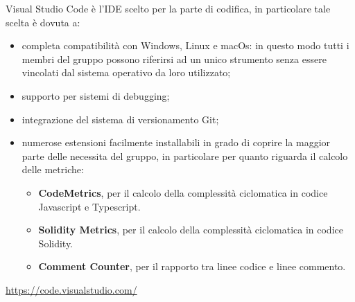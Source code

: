 	Visual Studio Code è l'IDE scelto per la parte di codifica, in particolare tale scelta è dovuta a:
	\begin{itemize}
		\item completa compatibilità con Windows, Linux e macOs: in questo modo tutti i membri del gruppo possono riferirsi ad un unico strumento senza essere vincolati dal sistema operativo da loro utilizzato;
		\item supporto per sistemi di debugging;
		\item integrazione del sistema di versionamento Git;
		\item numerose estensioni facilmente installabili in grado di coprire la maggior parte delle necessita del gruppo, in particolare per quanto riguarda il calcolo delle metriche:
		\begin{itemize}
			\item \textbf{CodeMetrics}, per il calcolo della complessità ciclomatica in codice Javascript e Typescript.
			\item \textbf{Solidity Metrics}, per il calcolo della complessità ciclomatica in codice Solidity.
			\item \textbf{Comment Counter}, per il rapporto tra linee codice e linee commento.
		\end{itemize}
	\end{itemize}
	\begin{center}
		\url{https://code.visualstudio.com/}
	\end{center}
